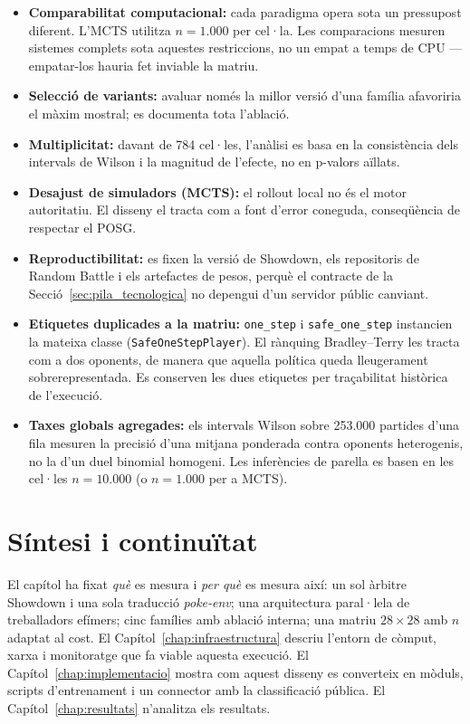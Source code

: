 \begin{itemize}
    \item \textbf{Comparabilitat computacional:} cada paradigma opera sota un pressupost diferent. L'MCTS utilitza $n=1.000$ per cel·la. Les comparacions mesuren sistemes complets sota aquestes restriccions, no un empat a temps de CPU ---empatar-los hauria fet inviable la matriu.
    \item \textbf{Selecció de variants:} avaluar només la millor versió d'una família afavoriria el màxim mostral; es documenta tota l'ablació.
    \item \textbf{Multiplicitat:} davant de 784 cel·les, l'anàlisi es basa en la consistència dels intervals de Wilson i la magnitud de l'efecte, no en p-valors aïllats.
    \item \textbf{Desajust de simuladors (MCTS):} el rollout local no és el motor autoritatiu. El disseny el tracta com a font d'error coneguda, conseqüència de respectar el POSG.
    \item \textbf{Reproductibilitat:} es fixen la versió de Showdown, els repositoris de Random Battle i els artefactes de pesos, perquè el contracte de la Secció~\ref{sec:pila_tecnologica} no depengui d'un servidor públic canviant.
    \item \textbf{Etiquetes duplicades a la matriu:} \texttt{one\_step} i \texttt{safe\_one\_step} instancien la mateixa classe (\texttt{SafeOneStepPlayer}). El rànquing Bradley--Terry les tracta com a dos oponents, de manera que aquella política queda lleugerament sobrerepresentada. Es conserven les dues etiquetes per traçabilitat històrica de l'execució.
    \item \textbf{Taxes globals agregades:} els intervals Wilson sobre 253.000 partides d'una fila mesuren la precisió d'una mitjana ponderada contra oponents heterogenis, no la d'un duel binomial homogeni. Les inferències de parella es basen en les cel·les $n=10.000$ (o $n=1.000$ per a MCTS).
\end{itemize}

\section{Síntesi i continuïtat}
\label{sec:fases}

El capítol ha fixat \emph{què} es mesura i \emph{per què} es mesura així: un sol àrbitre Showdown i una sola traducció \textit{poke-env}; una arquitectura paral·lela de treballadors efímers; cinc famílies amb ablació interna; una matriu $28\times 28$ amb $n$ adaptat al cost. El Capítol~\ref{chap:infraestructura} descriu l'entorn de còmput, xarxa i monitoratge que fa viable aquesta execució. El Capítol~\ref{chap:implementacio} mostra com aquest disseny es converteix en mòduls, scripts d'entrenament i un connector amb la classificació pública. El Capítol~\ref{chap:resultats} n'analitza els resultats.

